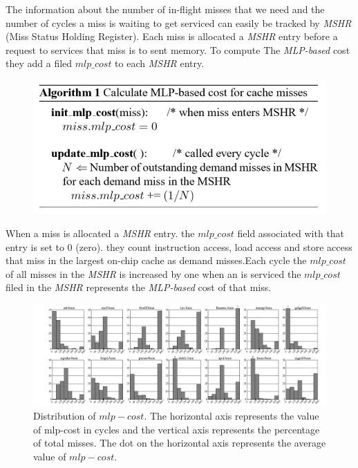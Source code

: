\documentclass{report}
\begin{document}
The information about the number of in-flight misses that we need and the number of cycles a miss is waiting to get serviced can easily be tracked by \emph{MSHR}
(Miss Status Holding Register). Each miss is allocated a
\emph{MSHR} entry before a request to services that miss is to sent memory. To compute The \emph{MLP-based} cost they add a filed \emph{$mlp\_cost$} to each
\emph{MSHR} entry.
\begin{figure}[h!]
\includegraphics[width=1\textwidth]{./fig10}

\end{figure}

When a miss is allocated a \emph{MSHR} entry. the $mlp\_cost$ field associated with that entry is set to 0 (zero). they count instruction access, load access and store access that miss in the largest on-chip cache as demand misses.Each cycle the $mlp\_cost$ of all misses in the \emph{MSHR} is increased by one when an is serviced the  $mlp\_cost$ filed in the \emph{MSHR} represents the \emph{MLP-based} cost of that miss.

\begin{figure}[h!]
\includegraphics[width=1\textwidth]{./fig11}
\caption{Distribution of $mlp-cost$. The horizontal axis represents the value of mlp-cost in cycles and the vertical axis represents the percentage of total misses. The dot on the horizontal axis represents the average value of $mlp-cost$.}
\label{fig11}

\end{figure}
\end{document}
